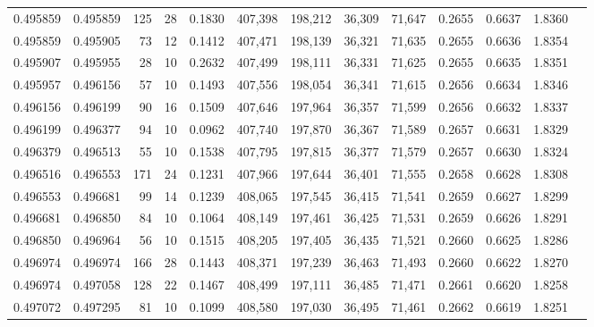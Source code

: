 \begin{tabular}{rrrrrrrrrrrrr}
0.495859 & 0.495859 &   125 &  28 &                                     0.1830 & 407,398 & 198,212 &  36,309 &  71,647 & 0.2655 & 0.6637 & 1.8360 \\
0.495859 & 0.495905 &    73 &  12 &                                     0.1412 & 407,471 & 198,139 &  36,321 &  71,635 & 0.2655 & 0.6636 & 1.8354 \\
0.495907 & 0.495955 &    28 &  10 &                                     0.2632 & 407,499 & 198,111 &  36,331 &  71,625 & 0.2655 & 0.6635 & 1.8351 \\
0.495957 & 0.496156 &    57 &  10 &                                     0.1493 & 407,556 & 198,054 &  36,341 &  71,615 & 0.2656 & 0.6634 & 1.8346 \\
0.496156 & 0.496199 &    90 &  16 &                                     0.1509 & 407,646 & 197,964 &  36,357 &  71,599 & 0.2656 & 0.6632 & 1.8337 \\
0.496199 & 0.496377 &    94 &  10 &                                     0.0962 & 407,740 & 197,870 &  36,367 &  71,589 & 0.2657 & 0.6631 & 1.8329 \\
0.496379 & 0.496513 &    55 &  10 &                                     0.1538 & 407,795 & 197,815 &  36,377 &  71,579 & 0.2657 & 0.6630 & 1.8324 \\
0.496516 & 0.496553 &   171 &  24 &                                     0.1231 & 407,966 & 197,644 &  36,401 &  71,555 & 0.2658 & 0.6628 & 1.8308 \\
0.496553 & 0.496681 &    99 &  14 &                                     0.1239 & 408,065 & 197,545 &  36,415 &  71,541 & 0.2659 & 0.6627 & 1.8299 \\
0.496681 & 0.496850 &    84 &  10 &                                     0.1064 & 408,149 & 197,461 &  36,425 &  71,531 & 0.2659 & 0.6626 & 1.8291 \\
0.496850 & 0.496964 &    56 &  10 &                                     0.1515 & 408,205 & 197,405 &  36,435 &  71,521 & 0.2660 & 0.6625 & 1.8286 \\
0.496974 & 0.496974 &   166 &  28 &                                     0.1443 & 408,371 & 197,239 &  36,463 &  71,493 & 0.2660 & 0.6622 & 1.8270 \\
0.496974 & 0.497058 &   128 &  22 &                                     0.1467 & 408,499 & 197,111 &  36,485 &  71,471 & 0.2661 & 0.6620 & 1.8258 \\
0.497072 & 0.497295 &    81 &  10 &                                     0.1099 & 408,580 & 197,030 &  36,495 &  71,461 & 0.2662 & 0.6619 & 1.8251 \\

\end{tabular}
